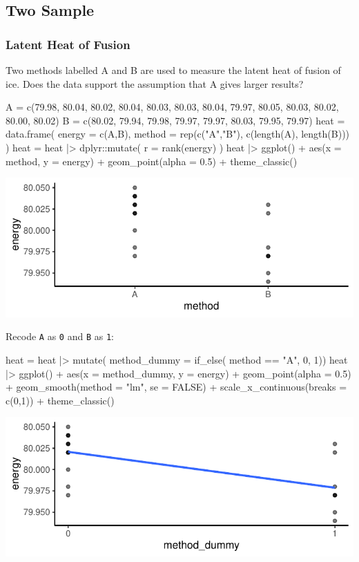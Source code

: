 \documentclass[a4paper]{article}
\begin{document}
\subsection{Two Sample}
\subsubsection{Latent Heat of Fusion}
Two methods labelled A and B are used to measure the latent heat of fusion of ice. Does the data support the assumption that A gives larger results?
\begin{Schunk}
\begin{Sinput}
A = c(79.98, 80.04, 80.02, 80.04, 80.03, 80.03, 80.04, 
      79.97, 80.05, 80.03, 80.02, 80.00, 80.02)
B = c(80.02, 79.94, 79.98, 79.97, 79.97, 80.03, 79.95, 
      79.97)
heat = data.frame(
  energy = c(A,B),
  method = rep(c("A","B"), c(length(A), length(B)))
)
heat = heat |> dplyr::mutate(
  r = rank(energy)
)
heat |> ggplot() + 
  aes(x = method, y = energy) + 
  geom_point(alpha = 0.5) +
  theme_classic()
\end{Sinput}


{\centering \includegraphics[width=\maxwidth]{figure/listings-unnamed-chunk-191-1} 

}

\end{Schunk}
Recode \lstinline|A| as \lstinline|0| and \lstinline|B| as \lstinline|1|:
\begin{Schunk}
\begin{Sinput}
heat = heat |> mutate(
  method_dummy = if_else(
    method == "A", 0, 1))
heat |> ggplot() +
  aes(x = method_dummy, 
      y = energy) + 
  geom_point(alpha = 0.5) + 
  geom_smooth(method = "lm",
              se = FALSE) + 
  scale_x_continuous(breaks = c(0,1)) +
  theme_classic()
\end{Sinput}


{\centering \includegraphics[width=\maxwidth]{figure/listings-unnamed-chunk-192-1} 

}

\end{Schunk}
\end{document}
